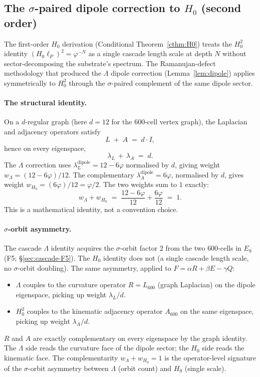\documentclass[11pt]{article}
\theoremstyle{plain}
\theoremstyle{definition}
\theoremstyle{remark}
\begin{document}
\subsection{The $\sigma$-paired dipole correction to $H_0$ (second order)}\label{sec:H0-dipole}

The first-order $H_0$ derivation (Conditional Theorem~\ref{cthm:H0}) treats the $H_0^2$ identity $(H_0 \ell_P)^2 = \varphi^{-N}$ as a single cascade length scale at depth $N$ without sector-decomposing the substrate's spectrum. The Ramanujan-defect methodology that produced the $\Lambda$ dipole correction (Lemma~\ref{lem:dipole}) applies symmetrically to $H_0^2$ through the $\sigma$-paired complement of the same dipole sector.

\paragraph{The structural identity.} On a $d$-regular graph (here $d = 12$ for the 600-cell vertex graph), the Laplacian and adjacency operators satisfy
\[
  L \;+\; A \;=\; d \cdot I,
\]
hence on every eigenspace,
\[
  \lambda_L \,+\, \lambda_A \;=\; d.
\]
The $\Lambda$ correction uses $\lambda_L^{\mathrm{dipole}} = 12 - 6\varphi$ normalised by $d$, giving weight $w_\Lambda = (12 - 6\varphi)/12$. The complementary $\lambda_A^{\mathrm{dipole}} = 6\varphi$, normalised by $d$, gives weight $w_{H_0} = (6\varphi)/12 = \varphi/2$. The two weights sum to $1$ exactly:
\[
  w_\Lambda + w_{H_0} \;=\; \frac{12 - 6\varphi}{12} + \frac{6\varphi}{12} \;=\; 1.
\]
This is a mathematical identity, not a convention choice.

\paragraph{$\sigma$-orbit asymmetry.} The cascade $\Lambda$ identity acquires the $\sigma$-orbit factor $2$ from the two $600$-cells in $E_8$ (F5; \S\ref{sec:cascade-F5}). The $H_0$ identity does not (a single cascade length scale, no $\sigma$-orbit doubling). The same asymmetry, applied to $F = \alpha R + \beta E - \gamma Q$:
\begin{itemize}[leftmargin=2em]
\item $\Lambda$ couples to the curvature operator $R = L_{600}$ (graph Laplacian) on the dipole eigenspace, picking up weight $\lambda_L/d$.
\item $H_0^2$ couples to the kinematic adjacency operator $A_{600}$ on the same eigenspace, picking up weight $\lambda_A/d$.
\end{itemize}
$R$ and $A$ are exactly complementary on every eigenspace by the graph identity. The $\Lambda$ side reads the curvature face of the dipole sector; the $H_0$ side reads the kinematic face. The complementarity $w_\Lambda + w_{H_0} = 1$ is the operator-level signature of the $\sigma$-orbit asymmetry between $\Lambda$ (orbit count) and $H_0$ (single scale).
\end{document}
